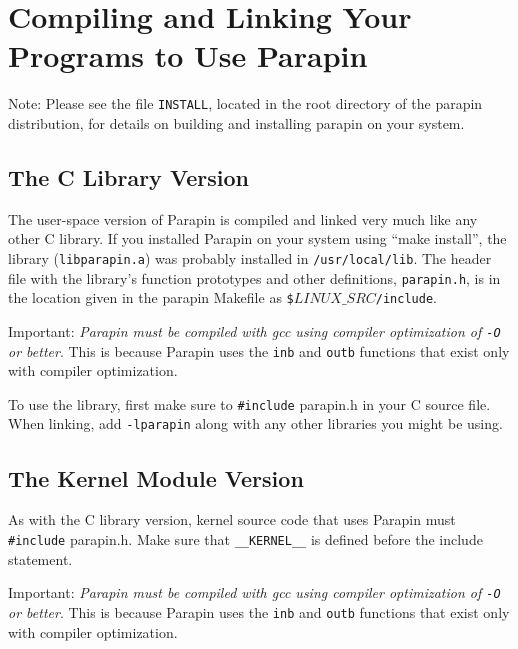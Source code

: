 \documentclass{article}
\begin{document}
\section{Compiling and Linking Your Programs to Use Parapin}
\label{compiling}

Note: Please see the file {\tt INSTALL}, located in the root directory
of the parapin distribution, for details on building and installing
parapin on your system.

\subsection{The C Library Version}

The user-space version of Parapin is compiled and linked very much
like any other C library.  If you installed Parapin on your system
using ``make install'', the library ({\tt libparapin.a}) was probably
installed in {\tt /usr/local/lib}.  The header file with the library's
function prototypes and other definitions, {\tt parapin.h}, is
in the location given in the parapin Makefile as
{\tt \$\(LINUX\_SRC\)/include}.

Important: {\em Parapin must be compiled with gcc using compiler
optimization of {\tt -O} or better}.  This is because Parapin uses the
{\tt inb} and {\tt outb} functions that exist only with compiler
optimization.

To use the library, first make sure to {\tt \#include} parapin.h in
your C source file.  When linking, add {\tt -lparapin} along with any
other libraries you might be using.


\subsection{The Kernel Module Version}

As with the C library version, kernel source code that uses Parapin
must {\tt \#include} parapin.h.  Make sure that \verb|__KERNEL__| is
defined before the include statement.

Important: {\em Parapin must be compiled with gcc using compiler
optimization of {\tt -O} or better}.  This is because Parapin uses the
{\tt inb} and {\tt outb} functions that exist only with compiler
optimization.
\end{document}

